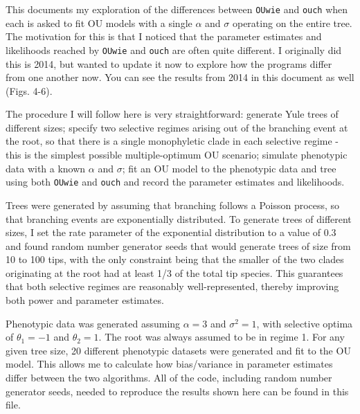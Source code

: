 \documentclass[12pt,reqno,final]{amsart}\usepackage[]{graphicx}\usepackage[]{color}
\title[]{}
\theoremstyle{plain}
\numberwithin{equation}{part}
\begin{document}
\maketitle

This documents my exploration of the differences between \texttt{OUwie} and \texttt{ouch} when each is asked to fit OU models with a single $\alpha$ and $\sigma$ operating on the entire tree.
The motivation for this is that I noticed that the parameter estimates and likelihoods reached by \texttt{OUwie} and \texttt{ouch} are often quite different.
I originally did this is 2014, but wanted to update it now to explore how the programs differ from one another now.
You can see the results from 2014 in this document as well (Figs. 4-6).

The procedure I will follow here is very straightforward: generate Yule trees of different sizes; specify two selective regimes arising out of the branching event at the root, so that there is a single monophyletic clade in each selective regime - this is the simplest possible multiple-optimum OU scenario; simulate phenotypic data with a known $\alpha$ and $\sigma$; fit an OU model to the phenotypic data and tree using both \texttt{OUwie} and \texttt{ouch} and record the parameter estimates and likelihoods.

Trees were generated by assuming that branching follows a Poisson process, so that branching events are exponentially distributed. To generate trees of different sizes, I set the rate parameter of the exponential distribution to a value of 0.3 and found random number generator seeds that would generate trees of size from 10 to 100 tips, with the only constraint being that the smaller of the two clades originating at the root had at least 1/3 of the total tip species.
This guarantees that both selective regimes are reasonably well-represented, thereby improving both power and parameter estimates.

Phenotypic data was generated assuming $\alpha=3$ and $\sigma^2=1$, with selective optima of $\theta_1=-1$ and $\theta_2=1$. The root was always assumed to be in regime 1. For any given tree size, 20 different phenotypic datasets were generated and fit to the OU model.
This allows me to calculate how bias/variance in parameter estimates differ between the two algorithms.
All of the code, including random number generator seeds, needed to reproduce the results shown here can be found in this file.
\end{document}
